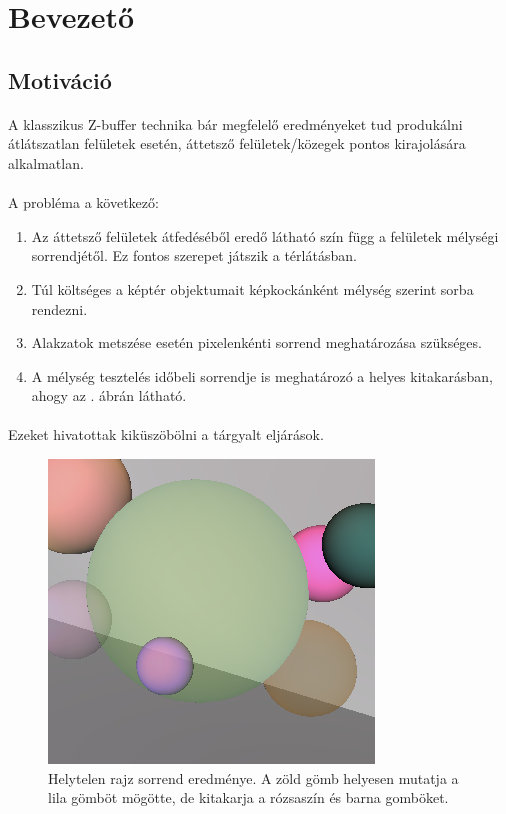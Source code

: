 \section{Bevezető}
\subsection{Motiváció}
\paragraph{}A klasszikus Z-buffer technika bár megfelelő eredményeket tud produkálni átlátszatlan felületek esetén, áttetsző felületek/közegek pontos kirajolására alkalmatlan.
\paragraph{}A probléma a következő:
\begin{enumerate}
	\item Az áttetsző felületek átfedéséből eredő látható szín függ a felületek mélységi sorrendjétől. Ez fontos szerepet játszik a térlátásban.
	\item Túl költséges a képtér objektumait képkockánként mélység szerint sorba rendezni.
	\item Alakzatok metszése esetén pixelenkénti sorrend meghatározása szükséges.
	\item A mélység tesztelés időbeli sorrendje is meghatározó a helyes kitakarásban, ahogy az . ábrán látható.
\end{enumerate}

\paragraph{}
Ezeket hivatottak kiküszöbölni a tárgyalt eljárások.
\vfill
\begin{figure}[bp]
	\centering
	\includegraphics[scale=0.4]{invisglass.png}
	\caption{Helytelen rajz sorrend eredménye. A zöld gömb helyesen mutatja a lila gömböt mögötte, de kitakarja a rózsaszín és barna gomböket.}
	\label{img:invisglass}
\end{figure}

\newpage
